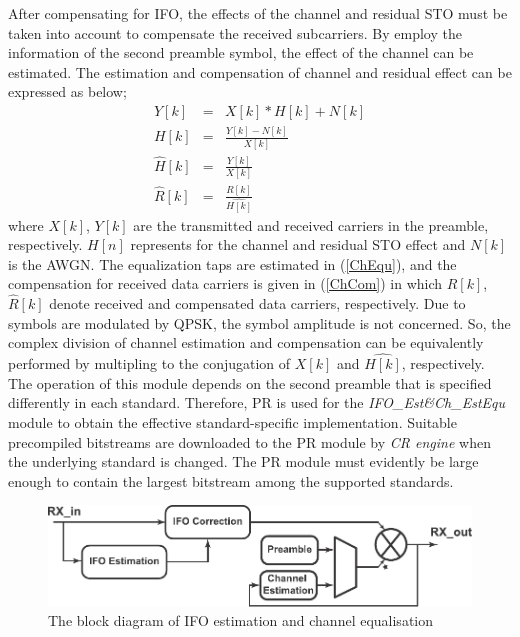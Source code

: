 \begin{enumerate}
After compensating for IFO, the effects of the channel and residual STO must be taken into account to compensate the received subcarriers.
By employ the information of the second preamble symbol, the effect of the channel can be estimated. 
The estimation and compensation of channel and residual effect can be expressed as below;
\begin{eqnarray}
\label{ChEqu}
Y[k] &=& X[k] * H[k] + N[k] \nonumber \\
H[k] &=& \frac{Y[k]-N[k]}{X[k]} \nonumber \\
\hat{H}[k] &=& \frac{Y[k]}{X[k]}\\
\label{ChCom}
\hat{R}[k] &=& \frac{R[k]}{\hat{H[k]}}
\end{eqnarray}
where $X[k]$, $Y[k]$ are the transmitted and received carriers in the preamble, respectively. 
$H[n]$ represents for the channel and residual STO effect and $N[k]$ is the AWGN.
The equalization taps are estimated in (\ref{ChEqu}), and the compensation for received data carriers is given in (\ref{ChCom}) 
in which $R[k]$, $\hat{R}[k]$ denote received and compensated data carriers, respectively.
Due to symbols are modulated by QPSK, the symbol amplitude is not concerned. So, the complex division of channel estimation and compensation can be equivalently performed by multipling to the conjugation of $X[k]$ and $\hat{H[k]}$, respectively. 
The operation of this module depends on the second preamble that is specified differently in each standard.
Therefore, PR is used for the \emph{IFO\_Est\&Ch\_EstEqu} module to obtain the effective standard-specific implementation.
Suitable precompiled bitstreams are downloaded to the PR module by \emph{CR engine} when the underlying standard is changed.
The PR module must evidently be large enough to contain the largest bitstream among the supported standards.
\begin{figure}
\centering
\includegraphics [width=0.9\columnwidth]{Figures/MSCR_RX_IFOCh.pdf}
\caption{The block diagram of IFO estimation and channel equalisation}
\label{fig:IFO}
\end{figure}


\end{enumerate}
